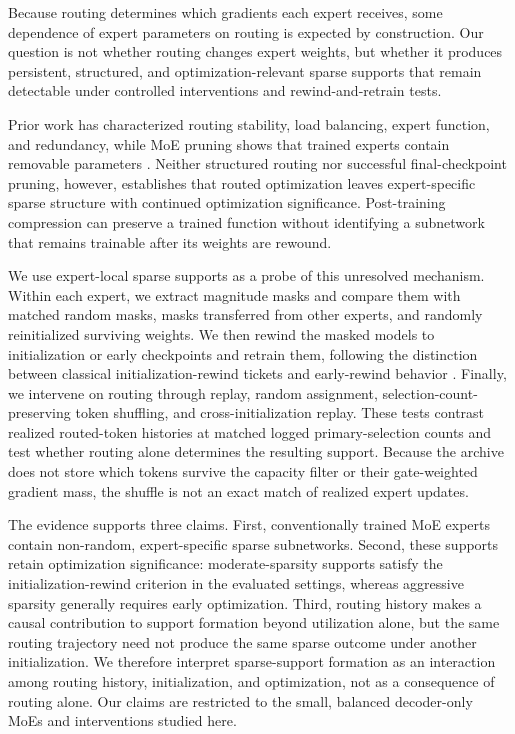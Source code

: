 \documentclass{article}
\begin{document}
Because routing determines which gradients each expert receives, some
dependence of expert parameters on routing is expected by construction. Our
question is not whether routing changes expert weights, but whether it produces
persistent, structured, and optimization-relevant sparse supports that remain
detectable under controlled interventions and rewind-and-retrain tests.

Prior work has characterized routing stability, load balancing, expert
function, and redundancy, while MoE pruning shows that trained experts contain
removable parameters
\citep{dai-etal-2022-stablemoe,
guo2026advancingexpertspecializationbetter,
xie2024moeprunerpruningmixtureofexpertslarge}. Neither structured routing nor
successful final-checkpoint pruning, however, establishes that routed
optimization leaves expert-specific sparse structure with continued
optimization significance. Post-training compression can preserve a trained
function without identifying a subnetwork that remains trainable after its
weights are rewound.

We use expert-local sparse supports as a probe of this unresolved mechanism.
Within each expert, we extract magnitude masks and compare them with matched
random masks, masks transferred from other experts, and randomly reinitialized
surviving weights. We then rewind the masked models to initialization or early
checkpoints and retrain them, following the distinction between classical
initialization-rewind tickets and early-rewind behavior
\citep{frankle2019lotterytickethypothesisfinding,pmlr-v119-frankle20a}.
Finally, we intervene on routing through replay, random assignment,
selection-count-preserving token shuffling, and cross-initialization replay.
These tests contrast realized routed-token histories at matched logged
primary-selection counts and test whether routing alone determines the
resulting support. Because the
archive does not store which tokens survive the capacity filter or their
gate-weighted gradient mass, the shuffle is not an exact match of realized
expert updates.

The evidence supports three claims. First, conventionally trained MoE experts
contain non-random, expert-specific sparse subnetworks. Second, these supports
retain optimization significance: moderate-sparsity supports satisfy the
initialization-rewind criterion in the evaluated settings, whereas aggressive
sparsity generally requires early optimization. Third, routing history makes a
causal contribution to support formation beyond utilization alone, but the same
routing trajectory need not produce the same sparse outcome under another
initialization. We therefore interpret sparse-support formation as an
interaction among routing history, initialization, and optimization, not as a
consequence of routing alone. Our claims are restricted to the small, balanced
decoder-only MoEs and interventions studied here.
\end{document}
